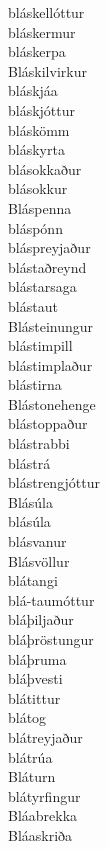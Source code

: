 \documentclass[../samsetningasafn.tex]{subfiles}
\begin{document}
\begin{bigwordlist}
\begin{footnotesize}
\begin{multicols}{4}
\begin{description}
		\item [bláskellóttur]
		\item [bláskermur]
		\item [bláskerpa]
		\item [Bláskilvirkur]
		\item [bláskjáa]
		\item [bláskjóttur]
		\item [bláskömm]
		\item [bláskyrta]
		\item [blásokkaður]
		\item [blásokkur]
		\item [Bláspenna]
		\item [bláspónn]
		\item [bláspreyjaður]
		\item [blástaðreynd]
		\item [blástarsaga]
		\item [blástaut]
		\item [Blásteinungur]
		\item [blástimpill]
		\item [blástimplaður]
		\item [blástirna]
		\item [Blástonehenge]
		\item [blástoppaður]
		\item [blástrabbi]
		\item [blástrá]
		\item [blástrengjóttur]
		\item [Blásúla]
		\item [blásúla]
		\item [blásvanur]
		\item [Blásvöllur]
		\item [blátangi]
		\item [blá-taumóttur]
		\item [bláþiljaður]
		\item [bláþröstungur]
		\item [bláþruma]
		\item [bláþvesti]
		\item [blátittur]
		\item [blátog]
		\item [blátreyjaður]
		\item [blátrúa]
		\item [Bláturn]
		\item [blátyrfingur]
		\item [Bláabrekka]
		\item [Bláaskriða]

\end{description}
\end{multicols}
\end{footnotesize}
\end{bigwordlist}
\end{document}
